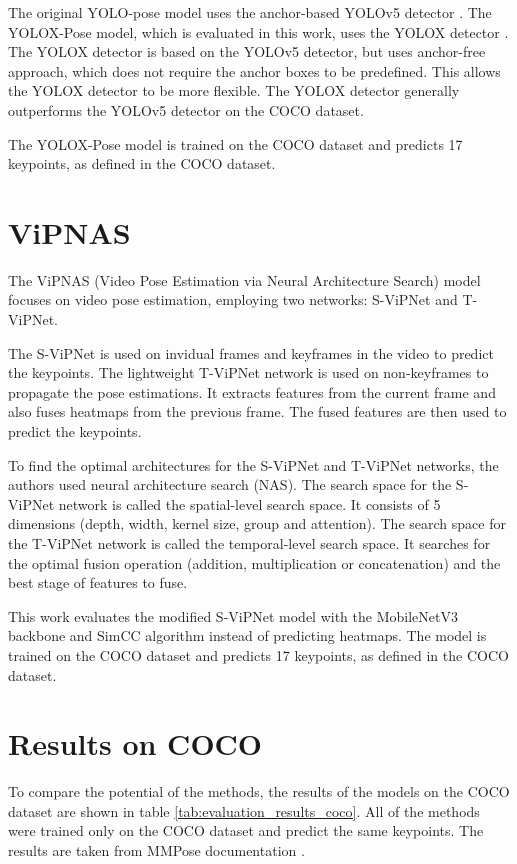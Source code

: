 The original YOLO-pose \cite{yoloPose} model uses the anchor-based YOLOv5 detector \cite{yolov5}. The YOLOX-Pose model, which is evaluated in this work, uses the YOLOX detector \cite{yolox}. The YOLOX detector is based on the YOLOv5 detector, but uses anchor-free approach, which does not require the anchor boxes to be predefined. This allows the YOLOX detector to be more flexible. The YOLOX detector generally outperforms the YOLOv5 detector on the COCO dataset.

The YOLOX-Pose model is trained on the COCO dataset and predicts 17 keypoints, as defined in the COCO dataset.

\section{ViPNAS}
\label{vipnas}

The ViPNAS (Video Pose Estimation via Neural Architecture Search) \cite{vipnas} model focuses on video pose estimation, employing two networks: S-ViPNet and T-ViPNet.

The S-ViPNet is used on invidual frames and keyframes in the video to predict the keypoints. The lightweight T-ViPNet network is used on non-keyframes to propagate the pose estimations. It extracts features from the current frame and also fuses heatmaps from the previous frame. The fused features are then used to predict the keypoints.

To find the optimal architectures for the S-ViPNet and T-ViPNet networks, the authors used neural architecture search (NAS). The search space for the S-ViPNet network is called the spatial-level search space. It consists of 5 dimensions (depth, width, kernel size, group and attention). The search space for the T-ViPNet network is called the temporal-level search space. It searches for the optimal fusion operation (addition, multiplication or concatenation) and the best stage of features to fuse.

This work evaluates the modified S-ViPNet model with the MobileNetV3 \cite{mobilenetv3} backbone and SimCC \cite{simcc} algorithm instead of predicting heatmaps. The model is trained on the COCO dataset and predicts 17 keypoints, as defined in the COCO dataset.

\section{Results on COCO}
To compare the potential of the methods, the results of the models on the COCO dataset are shown in table \ref{tab:evaluation_results_coco}. All of the methods were trained only on the COCO dataset and predict the same keypoints. The results are taken from MMPose documentation \cite{mmpose2020}.

